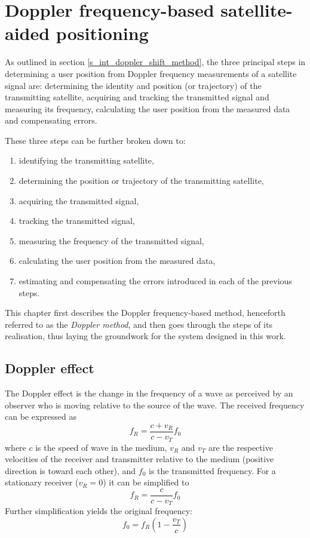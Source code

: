 \chapter{Doppler frequency-based satellite-aided positioning}
As outlined in section \ref{s_int_doppler_shift_method}, the three principal steps in determining a user position from Doppler frequency measurements of a satellite signal are: determining the identity and position (or trajectory) of the transmitting satellite, acquiring and tracking the transmitted signal and measuring its frequency, calculating the user position from the measured data and compensating errors. 

These three steps can be further broken down to:
\begin{enumerate}
    \item identifying the transmitting satellite,
    \item determining the position or trajectory of the transmitting satellite,
    \item acquiring the transmitted signal,
    \item tracking the transmitted signal,
    \item measuring the frequency of the transmitted signal,
    \item calculating the user position from the measured data,
    \item estimating and compensating the errors introduced in each of the previous steps.
\end{enumerate}

This chapter first describes the Doppler frequency-based method, henceforth referred to as the \emph{Doppler method}, and then goes through the steps of its realisation, thus laying the groundwork for the system designed in this work.

\section{Doppler effect}
The Doppler effect is the change in the frequency of a wave as perceived by an observer who is moving relative to the source of the wave. The received frequency can be expressed as
\begin{equation*}
    f_R = \frac{c + v_R}{c - v_T} f_0
\end{equation*}
 where $c$ is the speed of wave in the medium, $v_R$ and $v_T$ are the respective velocities of the receiver and transmitter relative to the medium (positive direction is toward each other), and $f_0$ is the transmitted frequency. For a stationary receiver ($v_R = 0$) it can be simplified to
 \begin{equation}
 \label{e_pos_doppler}
    f_R = \frac{c}{c - v_T} f_0
\end{equation}
Further simplification yields the original frequency:
 \begin{equation}
 \label{e_pos_doppler_f0}
    f_0 = f_R (1 - \frac{v_T}{c})
\end{equation}


